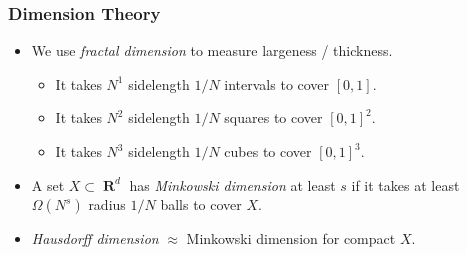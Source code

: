 \documentclass[usenames,dvipsnames]{beamer}
\DeclareMathOperator{\RR}{\textbf{R}}
\begin{document}
\begin{frame}
  \frametitle{Dimension Theory}

\begin{itemize}
    \item<1-> We use \emph{fractal dimension} to measure largeness / thickness.

    \begin{itemize}
        \item<2-> It takes $N^1$ sidelength $1/N$ intervals to cover $[0,1]$.
        \item<2-> It takes $N^2$ sidelength $1/N$ squares to cover $[0,1]^2$.
        \item<2-> It takes $N^3$ sidelength $1/N$ cubes to cover $[0,1]^3$.
    \end{itemize}

    \item<3-> A set $X \subset \RR^d$ has \emph{Minkowski dimension} at least $s$ if it takes at least $\Omega(N^s)$ radius $1/N$ balls to cover $X$.

    \item<4-> \emph{Hausdorff dimension} $\approx$ Minkowski dimension for compact $X$. 
\end{itemize}


\end{frame}
\end{document}
